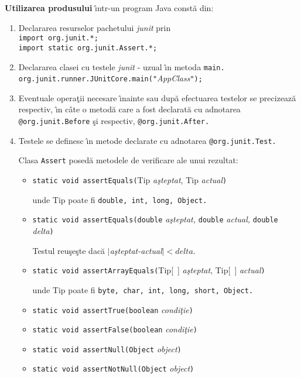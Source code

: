 \documentclass[12pt]{book}
\begin{document}
\textbf{Utilizarea produsului} \^{\i}ntr-un program Java const\u{a} din:
\begin{enumerate}
\item
Declararea resurselor pachetului \textit{junit} prin\\
\texttt{import org.junit.*;}\\
\texttt{import static org.junit.Assert.*;}
\item
Declararea clasei cu testele \textit{junit} - uzual \^{\i}n metoda \texttt{main.}\\
\texttt{org.junit.runner.JUnitCore.main("}\textit{AppClass}\texttt{");}
\item
Eventuale opera\c{t}ii necesare \^{\i}nainte sau dup\u{a} efectuarea testelor se precizeaz\u{a} respectiv,
\^{\i}n c\^{a}te o metod\u{a} care a fost declarat\u{a} cu adnotarea \texttt{@org.junit.Before} \c{s}i
respectiv, \texttt{@org.junit.After.}
\item
Testele se definesc \^{\i}n metode declarate cu adnotarea \texttt{@org.junit.Test.}

Clasa \texttt{Assert} posed\u{a} metodele de verificare ale unui rezultat:
\begin{itemize}
\item
\texttt{static void assertEquals(}Tip \textit{a\c{s}teptat}, Tip \textit{actual}\texttt{)}

unde Tip poate fi \texttt{double, int, long, Object.}
\item
\texttt{static void assertEquals(double} \textit{a\c{s}teptat,} \texttt{double} \textit{actual,} \texttt{double} \textit{delta}\texttt{)}

Testul reu\c{s}e\c{s}te dac\u{a} $|$\textit{a\c{s}teptat-actual}$|<delta.$
\item
\texttt{static void assertArrayEquals(}Tip[\ ] \textit{a\c{s}teptat}, Tip[\ ] \textit{actual}\texttt{)}

unde Tip poate fi \texttt{byte, char, int, long, short, Object.}
\item
\texttt{static void assertTrue(boolean} \textit{condi\c{t}ie}\texttt{)}
\item
\texttt{static void assertFalse(boolean} \textit{condi\c{t}ie}\texttt{)}
\item
\texttt{static void assertNull(Object} \textit{object}\texttt{)}
\item
\texttt{static void assertNotNull(Object} \textit{object}\texttt{)}
\end{itemize}
\end{enumerate}
\end{document}

